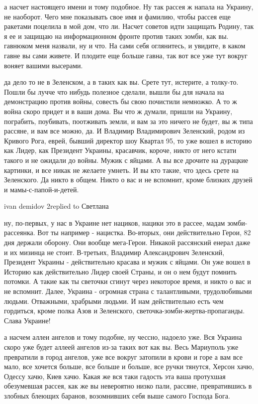 а насчет настоящего имени и тому подобное. Ну так рассея ж напала на Украину,
не наоборот. Чего мне показывать свое имя и фамилию, чтобы рассея еще ракетами
поцелила в мой дом, что ли. Насчет советов идти защищать Родину, так я ее и
защищаю на информационном фронте против таких зомби, как вы. гавнюком меня
назвали, ну и что. На сами себя оглянитесь, и увидите, в каком гавне вы сами
живете. И плодите еще больше гавна, так вот все уже тут вокруг воняет вашими
высерами.

да дело то не в Зеленском, а в таких как вы. Срете тут, истерите, а толку-то.
Пошли бы лучче что нибудь полезное сделали, вышли бы для начала на демонстрацию
против войны, совесть бы свою почистили немножко. А то ж война скоро придет и в
ваши дома. Вы что ж думали, пришли на Украину, пограбить, поубивать, поотживать
земли, и вам за это ничего не будет, вы ж типа рассяне, и вам все можно, да. И
Владимир Владимирович Зеленский, родом из Кривого Рога, еврей, бывший директор
шоу Квартал 95, то уже вошел в историю как Лидер, как Президент Украины,
красавчик, короче, никто от него кстати такого и не ожидали до войны. Мужик с
яйцами. А вы все дрочите на дурацкие картинки, и все никак не желаете умнеть. И
вы кто такие, что здесь срете на Зеленского. Да никто в общем. Никто о вас и не
вспомнит, кроме близких друзей и мамы-с-папой-и-детей.

ivan demidov 2replied to Светлана

ну, по-первых, у нас в Украине нет нациков, нацики это в рассее, мадам
зомби-рассеянка. Вот ты например - нацистка. Во-вторых, они действительно
Герои, 82 дня держали оборону. Они вообще мега-Герои. Никакой рассянский енерал
даже и их мизинца не стоит. В-третьих, Владимир Александрович Зеленский,
Президент Украины - действительно красава и мужик с яйцами. Он уже вошел в
Историю как действительно Лидер своей Страны, и он о нем будут помнить потомки.
А такие как ты светочки сгинут через некоторое время, и никто о вас и не
вспомнит. Далее, Украина - огромная страна с талантливыми, трудолюбивыми
людьми. Отважными, храбрыми людьми. И нам действительно есть чем гордиться,
кроме полка Азов и Зеленского, светочка-зомби-жертва-пропаганды. Слава Украине!

а насчем аллеи ангелов и тому подобне, ну чессно, надоело уже. Вся Украина
скоро уже будет аллеей ангелов из-за таких вот как вы. Весь Мариуполь уже
превратили в город ангелов, уже все вокруг затопили в крови и горе а вам все
мало, все хочется больше, все больше и больше, все ручки тянутся, Херсон хачю,
Одессу хачю, Киев хачю. Какая же вся таки гадость эта ваша протухшая
обезумевшая рассея, как же вы невероятно низко пали, рассяне, превратившись в
злобных блеющих баранов, возомнивших себя выше самого Господа Бога.

